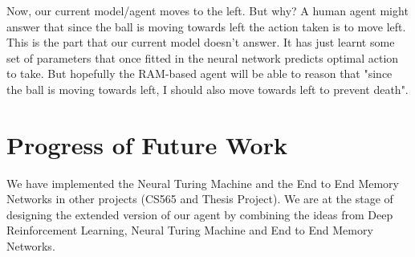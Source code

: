 \documentclass[conference]{IEEEtran}
\begin{document}

Now, our current model/agent moves to the left. But why? A human agent might answer that since the ball is moving towards left the action taken is to move left. This is the part that our current model doesn't answer. It has just learnt some set of parameters that once fitted in the neural network predicts optimal action to take. But hopefully the RAM-based agent will be able to reason that "since the ball is moving towards left, I should also move towards left to prevent death".

\section{Progress of Future Work}
We have implemented the Neural Turing Machine and the End to End Memory Networks in other projects (CS565 and Thesis Project). We are at the stage of designing the extended version of our agent by combining the ideas from Deep Reinforcement Learning, Neural Turing Machine and End to End Memory Networks.




%
\end{document}

